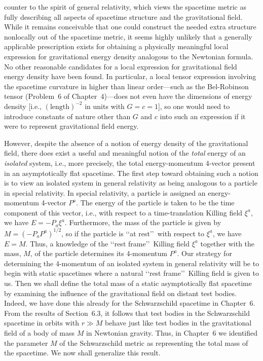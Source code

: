 counter to the spirit of general relativity, which views the spacetime metric as fully
describing all aspects of spacetime structure and the gravitational field. While it
remains conceivable that one could construct the needed extra structure nonlocally
out of the spacetime metric, it seems highly unlikely that a generally applicable
prescription exists for obtaining a physically meaningful local expression for
gravitational energy density analogous to the Newtonian formula. No other reasonable
candidates for a local expression for gravitational field energy density have been
found. In particular, a local tensor expression involving the spacetime curvature in
higher than linear order---such as the Bel-Robinson tensor (Problem~6 of
Chapter~4)---does not even have the dimensions of energy density [i.e.,
\((\text{length})^{-2}\) in units with \(G=c=1\)], so one would need to introduce
constants of nature other than \(G\) and \(c\) into such an expression if it were to
represent gravitational field energy.

However, despite the absence of a notion of energy density of the gravitational
field, there does exist a useful and meaningful notion of the \emph{total} energy of an
\emph{isolated} system, i.e., more precisely, the total energy-momentum 4-vector
present in an asymptotically flat spacetime. The first step toward obtaining such a
notion is to view an isolated system in general relativity as being analogous to a
particle in special relativity. In special relativity, a particle is assigned an
energy-momentum 4-vector \(P^a\). The energy of the particle is taken to be the time
component of this vector, i.e., with respect to a time-translation Killing field
\(\xi^a\), we have \(E=-P_a\xi^a\). Furthermore, the mass of the particle is given
by \(M=(-P_aP^a)^{1/2}\), so if the particle is \lq\lq at rest\rq\rq\ with respect to
\(\xi^a\), we have \(E=M\). Thus, a knowledge of the \lq\lq rest frame\rq\rq\ Killing
field \(\xi^a\) together with the mass, \(M\), of the particle determines its
4-momentum \(P^a\). Our strategy for determining the 4-momentum of an isolated
system in general relativity will be to begin with static spacetimes where a natural
\lq\lq rest frame\rq\rq\ Killing field is given to us. Then we shall define the total mass
of a static asymptotically flat spacetime by examining the influence of the
gravitational field on distant test bodies. Indeed, we have done this already for the
Schwarzschild spacetime in Chapter~6. From the results of Section~6.3, it follows
that test bodies in the Schwarzschild spacetime in orbits with \(r\gg M\) behave just
like test bodies in the gravitational field of a body of mass \(M\) in Newtonian
gravity. Thus, in Chapter~6 we identified the parameter \(M\) of the Schwarzschild
metric as representing the total mass of the spacetime. We now shall generalize this
result.

